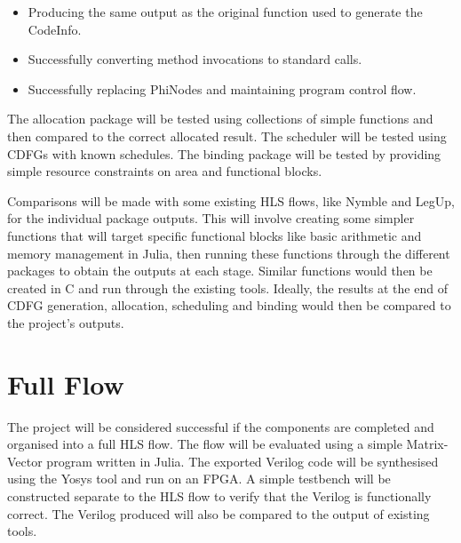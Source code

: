 \begin{itemize}
    \item Producing the same output as the original function used to generate the CodeInfo.
    \item Successfully converting method invocations to standard calls.
    \item Successfully replacing PhiNodes and maintaining program control flow.
\end{itemize}

The allocation package will be tested using collections of simple functions and then compared to the correct allocated result. The scheduler will be tested using CDFGs with known schedules. The binding package will be tested by providing simple resource constraints on area and functional blocks.

Comparisons will be made with some existing HLS flows, like Nymble and LegUp, for the individual package outputs. This will involve creating some simpler functions that will target specific functional blocks like basic arithmetic and memory management in Julia, then running these functions through the different packages to obtain the outputs at each stage. Similar functions would then be created in C and run through the existing tools. Ideally, the results at the end of CDFG generation, allocation, scheduling and binding would then be compared to the project's outputs.


\section{Full Flow}
The project will be considered successful if the components are completed and organised into a full HLS flow. The flow will be evaluated using a simple Matrix-Vector program written in Julia. The exported Verilog code will be synthesised using the Yosys tool and run on an FPGA. A simple testbench will be constructed separate to the HLS flow to verify that the Verilog is functionally correct. The Verilog produced will also be compared to the output of existing tools.

\fi